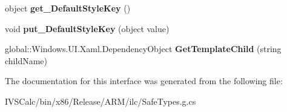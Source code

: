 \begin{DoxyCompactItemize}
object {\bfseries get\+\_\+\+Default\+Style\+Key} ()
\item 
\mbox{\label{interface_windows_1_1_u_i_1_1_xaml_1_1_controls_1_1_i_control_protected_a1ed23ea3ade8e163b61a3df46fd2362e}} 
void {\bfseries put\+\_\+\+Default\+Style\+Key} (object value)
\item 
\mbox{\label{interface_windows_1_1_u_i_1_1_xaml_1_1_controls_1_1_i_control_protected_a9d95d311e8cec4157bbe2bbd0ac7dc52}} 
global\+::\+Windows.\+U\+I.\+Xaml.\+Dependency\+Object {\bfseries Get\+Template\+Child} (string child\+Name)
\end{DoxyCompactItemize}


The documentation for this interface was generated from the following file\+:\begin{DoxyCompactItemize}
\item 
I\+V\+S\+Calc/bin/x86/\+Release/\+A\+R\+M/ilc/Safe\+Types.\+g.\+cs\end{DoxyCompactItemize}
